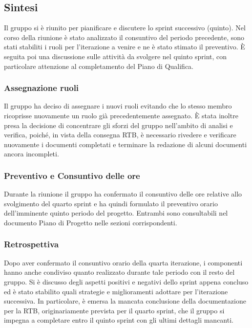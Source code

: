 \documentclass[10pt]{article}
\begin{document}
\subsection{Sintesi}
Il gruppo si è riunito per pianificare e discutere lo sprint successivo (quinto). Nel corso della riunione è stato analizzato il consuntivo
del periodo precedente, sono stati stabiliti i ruoli per l'iterazione a venire e ne è stato stimato il preventivo. È seguita poi una discussione
sulle attività da svolgere nel quinto sprint, con particolare attenzione al completamento del Piano di Qualifica.

\subsubsection{Assegnazione ruoli}
Il gruppo ha deciso di assegnare i nuovi ruoli evitando che lo stesso membro ricoprisse nuovamente un ruolo già precedentemente assegnato.
È stata inoltre presa la decisione di concentrare gli sforzi del gruppo nell'ambito di analisi e verifica, poiché, in vista della consegna RTB,
è necessario rivedere e verificare nuovamente i documenti completati e terminare la redazione di alcuni documenti ancora incompleti.

\subsubsection{Preventivo e Consuntivo delle ore}
Durante la riunione il gruppo ha confermato il consuntivo delle ore relative allo svolgimento del quarto sprint e ha quindi formulato il 
preventivo orario dell'imminente quinto periodo del progetto. Entrambi sono consultabili nel documento Piano di Progetto nelle sezioni
corrispondenti.

\subsubsection{Retrospettiva}
Dopo aver confermato il consuntivo orario della quarta iterazione, i componenti hanno anche condiviso quanto realizzato durante tale periodo
con il resto del gruppo. Si è discusso degli aspetti positivi e negativi dello sprint appena concluso ed è stato stabilito quali strategie e
miglioramenti adottare per l'iterazione successiva. In particolare, è emersa la mancata conclusione della documentazione per la RTB, 
originariamente prevista per il quarto sprint, che il gruppo si impegna a completare entro il quinto sprint con gli ultimi dettagli mancanti.
\end{document}
